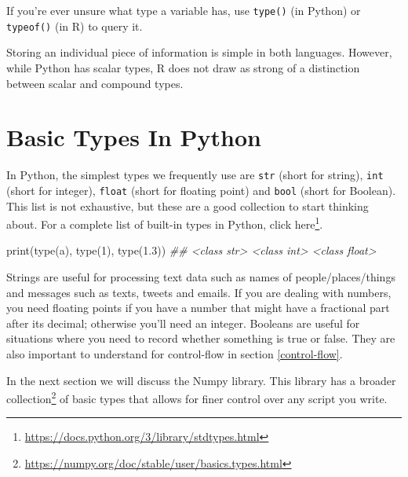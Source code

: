 \documentclass[
  12pt,
]{krantz}
\makeatletter
\newenvironment{Shaded}{\begin{snugshade}}{\end{snugshade}}
\newcommand{\BuiltInTok}[1]{#1}
\newcommand{\CommentTok}[1]{\textcolor[rgb]{0.37,0.37,0.37}{\textit{#1}}}
\newcommand{\DecValTok}[1]{\textcolor[rgb]{0.06,0.06,0.06}{#1}}
\newcommand{\FloatTok}[1]{\textcolor[rgb]{0.06,0.06,0.06}{#1}}
\newcommand{\NormalTok}[1]{#1}
\newcommand{\StringTok}[1]{\textcolor[rgb]{0.5,0.5,0.5}{#1}}
\renewcommand{\href}[2]{#2\footnote{\url{#1}}}
\newenvironment{kframe}{%
\medskip{}
\setlength{\fboxsep}{.8em}
 \def\at@end@of@kframe{}%
 \ifinner\ifhmode%
  \def\at@end@of@kframe{\end{minipage}}%
  \begin{minipage}{\columnwidth}%
 \fi\fi%
 \def\FrameCommand##1{\hskip\@totalleftmargin \hskip-\fboxsep
 \colorbox{shadecolor}{##1}\hskip-\fboxsep
     \hskip-\linewidth \hskip-\@totalleftmargin \hskip\columnwidth}%
 \MakeFramed {\advance\hsize-\width
   \@totalleftmargin\z@ \linewidth\hsize
   \@setminipage}}%
 {\par\unskip\endMakeFramed%
 \at@end@of@kframe}
\renewenvironment{Shaded}{\begin{kframe}}{\end{kframe}}
\makeatother
\begin{document}
If you're ever unsure what type a variable has, use \texttt{type()} (in Python) or \texttt{typeof()} (in R) to query it.

Storing an individual piece of information is simple in both languages. However, while Python has scalar types, R does not draw as strong of a distinction between scalar and compound types.

\hypertarget{basic-types-in-python}{%
\section{Basic Types In Python}\label{basic-types-in-python}}

In Python, the simplest types we frequently use are \texttt{str} (short for string), \texttt{int} (short for integer), \texttt{float} (short for floating point) and \texttt{bool} (short for Boolean). This list is not exhaustive, but these are a good collection to start thinking about. For a complete list of built-in types in Python, click \href{https://docs.python.org/3/library/stdtypes.html}{here}.

\begin{Shaded}
\begin{Highlighting}[]
\BuiltInTok{print}\NormalTok{(}\BuiltInTok{type}\NormalTok{(}\StringTok{\textquotesingle{}a\textquotesingle{}}\NormalTok{), }\BuiltInTok{type}\NormalTok{(}\DecValTok{1}\NormalTok{), }\BuiltInTok{type}\NormalTok{(}\FloatTok{1.3}\NormalTok{))}
\CommentTok{\#\# \textless{}class \textquotesingle{}str\textquotesingle{}\textgreater{} \textless{}class \textquotesingle{}int\textquotesingle{}\textgreater{} \textless{}class \textquotesingle{}float\textquotesingle{}\textgreater{}}
\end{Highlighting}
\end{Shaded}

Strings are useful for processing text data such as names of people/places/things and messages such as texts, tweets and emails. If you are dealing with numbers, you need floating points if you have a number that might have a fractional part after its decimal; otherwise you'll need an integer. Booleans are useful for situations where you need to record whether something is true or false. They are also important to understand for control-flow in section \ref{control-flow}.

In the next section we will discuss the Numpy library. This library has a \href{https://numpy.org/doc/stable/user/basics.types.html}{broader collection} of basic types that allows for finer control over any script you write.
\end{document}
